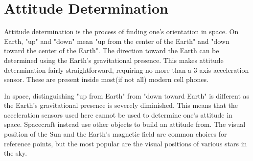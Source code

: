 \section{Attitude Determination}\label{sec:attitudeDetermination}
Attitude determination is the process of finding one's orientation in space. On Earth, "up" and "down" mean "up from
the center of the Earth" and "down toward the center of the Earth". The direction toward the Earth can be determined
using the Earth's gravitational presence. This makes attitude determination fairly straightforward, requiring no more
than a 3-axis acceleration sensor. These are present inside most(if not all) modern cell phones.

In space, distinguishing "up from Earth" from "down toward Earth" is different as the Earth's gravitational presence is
severely diminished. This means that the acceleration sensors used here cannot be used to determine one's attitude in
space. Spacecraft instead use other objects to build an attitude from. The visual position of the Sun and the Earth's
magnetic field are common choices for reference points, but the most popular are the visual positions of various stars
in the sky.

\begin{figure}
\end{figure}

